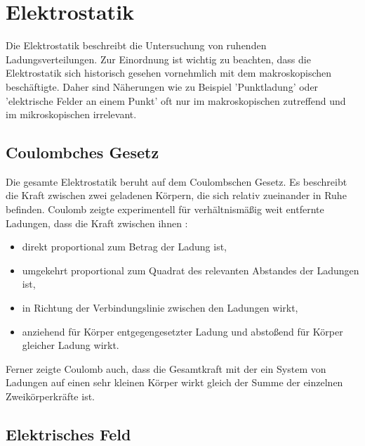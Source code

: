 \documentclass[12pt,a4paper]{report}%
\numberwithin{equation}{section}
\def\ezQu#1{'#1'}
\numberwithin{equation}{section}
\begin{document}
 
\chapter{Elektrostatik} 
Die Elektrostatik beschreibt die Untersuchung von ruhenden Ladungsverteilungen. Zur Einordnung ist wichtig zu beachten, dass die Elektrostatik sich historisch gesehen vornehmlich mit dem makroskopischen beschäftigte. Daher sind Näherungen wie zu Beispiel \ezQu{Punktladung} oder \ezQu{elektrische Felder an einem Punkt} oft nur im makroskopischen zutreffend und im mikroskopischen irrelevant.

	\section{Coulombches Gesetz}
	Die  gesamte Elektrostatik beruht auf dem Coulombschen Gesetz. Es beschreibt die Kraft zwischen zwei geladenen Körpern, die sich relativ zueinander in Ruhe befinden. Coulomb zeigte experimentell für verhältnismäßig weit entfernte Ladungen, dass die Kraft zwischen ihnen :
	\begin{itemize}
		\item direkt proportional zum Betrag der Ladung ist,
		\item umgekehrt proportional zum Quadrat des relevanten Abstandes der Ladungen ist,
		\item in Richtung der Verbindungslinie zwischen den Ladungen wirkt,
		\item anziehend für Körper entgegengesetzter Ladung und abstoßend für Körper gleicher Ladung wirkt.
	\end{itemize}
	Ferner zeigte Coulomb auch, dass die Gesamtkraft mit der ein System von Ladungen auf einen sehr kleinen Körper wirkt gleich der Summe der einzelnen Zweikörperkräfte ist.
	
	\section{Elektrisches Feld}
\end{document}

